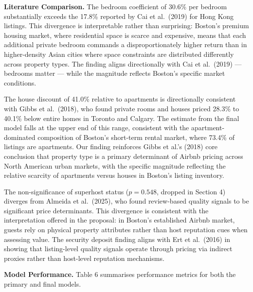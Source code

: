 \documentclass[
]{article}
\begin{document}
\textbf{Literature Comparison.} The bedroom coefficient of 30.6\% per
bedroom substantially exceeds the 17.8\% reported by Cai et al.~(2019)
for Hong Kong listings. This divergence is interpretable rather than
surprising: Boston's premium housing market, where residential space is
scarce and expensive, means that each additional private bedroom
commands a disproportionately higher return than in higher-density Asian
cities where space constraints are distributed differently across
property types. The finding aligns directionally with Cai et al.~(2019)
--- bedrooms matter --- while the magnitude reflects Boston's specific
market conditions.

The house discount of 41.0\% relative to apartments is directionally
consistent with Gibbs et al.~(2018), who found private rooms and houses
priced 28.3\% to 40.1\% below entire homes in Toronto and Calgary. The
estimate from the final model falls at the upper end of this range,
consistent with the apartment-dominated composition of Boston's
short-term rental market, where 73.4\% of listings are apartments. Our
finding reinforces Gibbs et al.'s (2018) core conclusion that property
type is a primary determinant of Airbnb pricing across North American
urban markets, with the specific magnitude reflecting the relative
scarcity of apartments versus houses in Boston's listing inventory.

The non-significance of superhost status (\(p = 0.548\), dropped in
Section 4) diverges from Almeida et al.~(2025), who found review-based
quality signals to be significant price determinants. This divergence is
consistent with the interpretation offered in the proposal: in Boston's
established Airbnb market, guests rely on physical property attributes
rather than host reputation cues when assessing value. The security
deposit finding aligns with Ert et al.~(2016) in showing that
listing-level quality signals operate through pricing via indirect
proxies rather than host-level reputation mechanisms.

\textbf{Model Performance.} Table 6 summarises performance metrics for
both the primary and final models.
\end{document}
